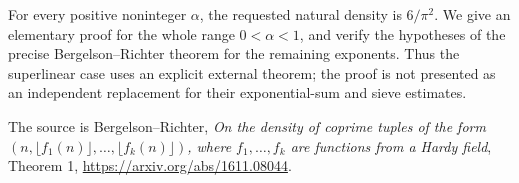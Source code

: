 For every positive noninteger $\alpha$, the requested natural density is $6/\pi^2$. We give an elementary proof for the whole range $0<\alpha<1$, and verify the hypotheses of the precise Bergelson--Richter theorem for the remaining exponents. Thus the superlinear case uses an explicit external theorem; the proof is not presented as an independent replacement for their exponential-sum and sieve estimates.

The source is Bergelson--Richter, \emph{On the density of coprime tuples of the form $(n,\lfloor f_1(n)\rfloor,\ldots,\lfloor f_k(n)\rfloor)$, where $f_1,\ldots,f_k$ are functions from a Hardy field}, Theorem 1, \url{https://arxiv.org/abs/1611.08044}.
